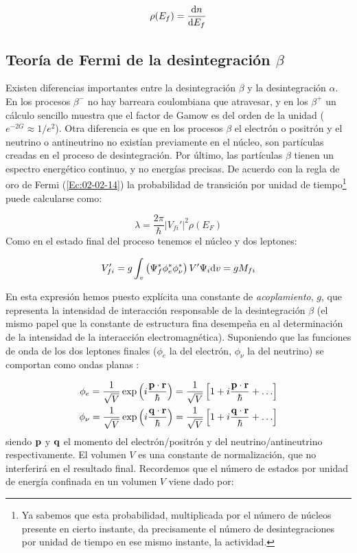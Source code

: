 \begin{equation}
	\rho(E_f) = \frac{\mathrm{d} n}{\mathrm{d} E_f}
\end{equation}

\subsection{Teoría de Fermi de la desintegración $\beta$}

Existen diferencias importantes entre la desintegración $\beta$ y la desintegración $\alpha$.  En los procesos $\beta^-$ no hay barreara coulombiana que atravesar, y en los $\beta^+$ un cálculo sencillo muestra que el factor de Gamow es del orden de la unidad ($e^{-2G} \approx 1/e^2$). Otra diferencia es que en los procesos $\beta$ el electrón o positrón y el neutrino o antineutrino no existían previamente en el núcleo, son partículas creadas en el proceso de desintegración. Por último, las partículas $\beta$ tienen un espectro energético continuo, y no energías precisas. De acuerdo con la regla de oro de Fermi (\ref{Ec:02-02-14}) la probabilidad de transición por unidad de tiempo\footnote{Ya sabemos que esta probabilidad, multiplicada por el número de núcleos presente en cierto instante, da precisamente el número de desintegraciones por unidad de tiempo en ese mismo instante, la actividad.} puede calcularse como: 

\begin{equation}
	\lambda = \frac{2\pi}{\hbar} |V_{fi}'|^2 \rho (E_F)
\end{equation}
Como en el estado final del proceso tenemos el núcleo y dos leptones:

\begin{equation}
	V_{fi}'  = g \int_v \left( \Psi_f^* \phi_e^* \phi_\nu^* \right) V' \Psi_i \mathrm{d} v = g M_{fi}
\end{equation}

En esta expresión hemos puesto explícita una constante de \textit{acoplamiento}, $g$, que representa la intensidad de interacción responsable de la desintegración $\beta$ (el mismo papel que la constante de estructura fina desempeña en al determinación de la intensidad de la interacción electromagnética). Suponiendo que las funciones de onda de los dos leptones finales ($\phi_e$ la del electrón, $\phi_\nu$ la del neutrino) se comportan como ondas planas :

\begin{eqnarray}
	\phi_e = \frac{1}{\sqrt{V}} \exp \left( i \frac{\mathbf{p} \cdot \mathbf{r}}{\hbar} \right) = \frac{1}{\sqrt{V}} \left[ 1+i\frac{\mathbf{p} \cdot \mathbf{r}}{\hbar}+ \ldots \right] \label{Ec:02-02-19}  \\
	\phi_\nu = \frac{1}{\sqrt{V}} \exp  \left( i \frac{\mathbf{q} \cdot \mathbf{r}}{\hbar} \right) = \frac{1}{\sqrt{V}} \left[ 1+i\frac{\mathbf{q} \cdot \mathbf{r}}{\hbar}+ \ldots \right] \label{Ec:02-02-20}
\end{eqnarray}
siendo $\mathbf{p}$ y $\mathbf{q}$ el momento del electrón/positrón y del neutrino/antineutrino respectivamente. El volumen $V$ es una constante de normalización, que no interferirá en el resultado final. Recordemos que el número de estados por unidad de energía confinada en un volumen $V$ viene dado por:

